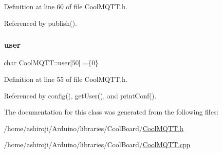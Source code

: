 Definition at line 60 of file Cool\+M\+Q\+T\+T.\+h.



Referenced by publish().

\mbox{\label{classCoolMQTT_a8cd47e45d457f908d4b4390b35aaee83}} 
\subsubsection{\texorpdfstring{user}{user}}
{\footnotesize\ttfamily char Cool\+M\+Q\+T\+T\+::user\mbox{[}50\mbox{]} =\{\textquotesingle{}0\textquotesingle{}\}\hspace{0.3cm}{\ttfamily [private]}}



Definition at line 55 of file Cool\+M\+Q\+T\+T.\+h.



Referenced by config(), get\+User(), and print\+Conf().



The documentation for this class was generated from the following files\+:\begin{DoxyCompactItemize}
\item 
/home/ashiroji/\+Arduino/libraries/\+Cool\+Board/\hyperlink{CoolMQTT_8h}{Cool\+M\+Q\+T\+T.\+h}\item 
/home/ashiroji/\+Arduino/libraries/\+Cool\+Board/\hyperlink{CoolMQTT_8cpp}{Cool\+M\+Q\+T\+T.\+cpp}\end{DoxyCompactItemize}
